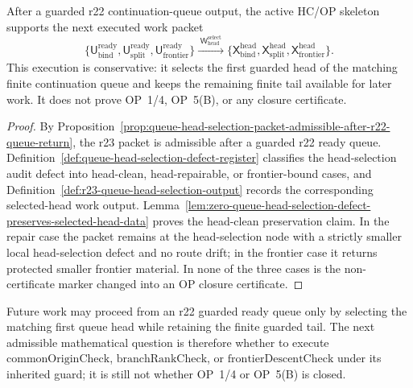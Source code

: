 \begin{theorem}
\label{thm:first-queue-head-selection-packet-after-continuation-queue}
After a guarded r22 continuation-queue output, the active HC/OP skeleton supports the next executed work packet
\[
  \{\mathsf U_{\mathrm{bind}}^{\mathrm{ready}},
    \mathsf U_{\mathrm{split}}^{\mathrm{ready}},
    \mathsf U_{\mathrm{frontier}}^{\mathrm{ready}}\}
  \xrightarrow{\;\mathsf W_{\mathrm{head}}^{\mathrm{select}}\;}
  \{\mathsf X_{\mathrm{bind}}^{\mathrm{head}},
    \mathsf X_{\mathrm{split}}^{\mathrm{head}},
    \mathsf X_{\mathrm{frontier}}^{\mathrm{head}}\}.
\]
This execution is conservative: it selects the first guarded head of the matching finite continuation queue and keeps the remaining finite tail available for later work.  It does not prove OP~1/4, OP~5(B), or any closure certificate.
\end{theorem}

\begin{proof}
By Proposition~\ref{prop:queue-head-selection-packet-admissible-after-r22-queue-return}, the r23 packet is admissible after a guarded r22 ready queue.  Definition~\ref{def:queue-head-selection-defect-register} classifies the head-selection audit defect into head-clean, head-repairable, or frontier-bound cases, and Definition~\ref{def:r23-queue-head-selection-output} records the corresponding selected-head work output.  Lemma~\ref{lem:zero-queue-head-selection-defect-preserves-selected-head-data} proves the head-clean preservation claim.  In the repair case the packet remains at the head-selection node with a strictly smaller local head-selection defect and no route drift; in the frontier case it returns protected smaller frontier material.  In none of the three cases is the non-certificate marker changed into an OP closure certificate.
\end{proof}

\begin{corollary}
\label{cor:v3340-r23-working-rule}
Future work may proceed from an r22 guarded ready queue only by selecting the matching first queue head while retaining the finite guarded tail.  The next admissible mathematical question is therefore whether to execute \(\mathrm{commonOriginCheck}\), \(\mathrm{branchRankCheck}\), or \(\mathrm{frontierDescentCheck}\) under its inherited guard; it is still not whether OP~1/4 or OP~5(B) is closed.
\end{corollary}

